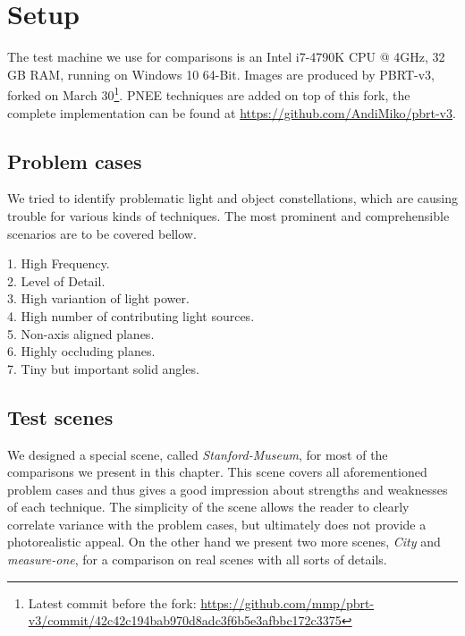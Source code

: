 \section{Setup}

The test machine we use for comparisons is an Intel i7-4790K CPU @ 4GHz, 32 GB RAM, running on Windows 10 64-Bit. Images are produced by PBRT-v3, forked on March 30\footnote{Latest commit before the fork: \url{https://github.com/mmp/pbrt-v3/commit/42c42c194bab970d8adc3f6b5e3afbbc172c3375}}. PNEE techniques are added on top of this fork, the complete implementation can be found at \url{https://github.com/AndiMiko/pbrt-v3}.

\subsection{Problem cases}

We tried to identify problematic light and object constellations, which are causing trouble for various kinds of techniques. The most prominent and comprehensible scenarios are to be covered bellow. 

\begin{description}
    \item[1. High Frequency.] 
    \item[2. Level of Detail.]
    \item[3. High variantion of light power.] 
    \item[4. High number of contributing light sources.]
    \item[5. Non-axis aligned planes.]
    \item[6. Highly occluding planes.]
    \item[7. Tiny but important solid angles.]
\label{li:problemcases}
\end{description} 

\subsection{Test scenes}

We designed a special scene, called \textit{Stanford-Museum}, for most of the comparisons we present in this chapter. This scene covers all aforementioned problem cases and thus gives a good impression about strengths and weaknesses of each technique. The simplicity of the scene allows the reader to clearly correlate variance with the problem cases, but ultimately does not provide a photorealistic appeal. On the other hand we present two more scenes, \textit{City} and \textit{measure-one}, for a comparison on real scenes with all sorts of details.

